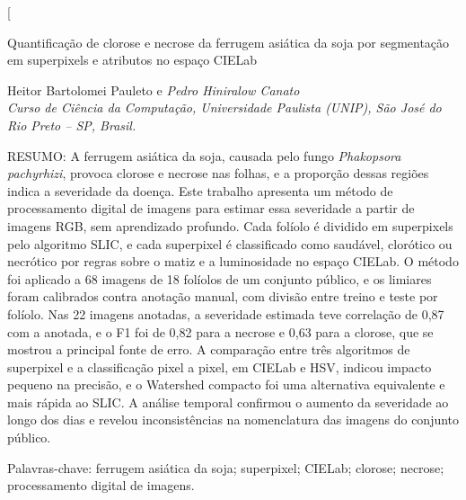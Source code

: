 \documentclass[10pt,a4paper,twocolumn]{article}
\begin{document}
\twocolumn[{%
\begin{center}
{\Large Quantificação de clorose e necrose da ferrugem asiática da soja por segmentação em superpixels e atributos no espaço CIELab\par}
\end{center}
\vspace{6pt}
Heitor Bartolomei Pauleto e \textit{Pedro Hiniralow Canato}\\
\textit{Curso de Ciência da Computação, Universidade Paulista (UNIP), São José do Rio Preto -- SP, Brasil.}

\vspace{10pt}
RESUMO: A ferrugem asiática da soja, causada pelo fungo
\textit{Phakopsora pachyrhizi}, provoca clorose e necrose nas folhas, e
a proporção dessas regiões indica a severidade da doença. Este trabalho
apresenta um método de processamento digital de imagens para estimar
essa severidade a partir de imagens RGB, sem aprendizado profundo. Cada
folíolo é dividido em superpixels pelo algoritmo SLIC, e cada superpixel
é classificado como saudável, clorótico ou necrótico por regras sobre o
matiz e a luminosidade no espaço CIELab. O método foi aplicado a 68
imagens de 18 folíolos de um conjunto público, e os limiares foram
calibrados contra anotação manual, com divisão entre treino e teste por
folíolo. Nas 22 imagens anotadas, a severidade estimada teve correlação
de 0,87 com a anotada, e o F1 foi de 0,82 para a necrose e 0,63 para a
clorose, que se mostrou a principal fonte de erro. A comparação entre
três algoritmos de superpixel e a classificação pixel a pixel, em CIELab
e HSV, indicou impacto pequeno na precisão, e o Watershed compacto foi
uma alternativa equivalente e mais rápida ao SLIC. A análise temporal
confirmou o aumento da severidade ao longo dos dias e revelou
inconsistências na nomenclatura das imagens do conjunto público.

\vspace{4pt}
Palavras-chave: ferrugem asiática da soja; superpixel; CIELab; clorose; necrose; processamento digital de imagens.

}
\end{document}
